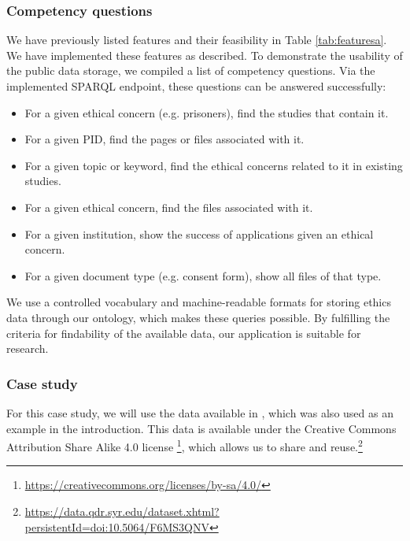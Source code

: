 \documentclass[10pt]{article}
\begin{document}
\subsubsection{Competency questions}
We have previously listed features and their feasibility in Table \ref{tab:featuresa}. We have implemented these features as described.
To demonstrate the usability of the public data storage, we compiled a list of competency questions. Via the implemented SPARQL endpoint, these questions can be answered successfully:

\begin{itemize}
    \item For a given ethical concern (e.g. prisoners), find the studies that contain it.
    \item For a given PID, find the pages or files associated with it.
    \item For a given topic or keyword, find the ethical concerns related to it in existing studies.
    \item For a given ethical concern, find the files associated with it.
    \item For a given institution, show the success of applications given an ethical concern.
    \item For a given document type (e.g. consent form), show all files of that type.
\end{itemize}

We use a controlled vocabulary and machine-readable formats for storing ethics data through our ontology, which makes these queries possible. By fulfilling the criteria for findability of the available data, our application is suitable for research.

\subsubsection{Case study}
For this case study, we will use the data available in \cite{casestudy}, which was also used as an example in the introduction. This data is available under the Creative Commons Attribution Share Alike 4.0 license \footnote{\url{https://creativecommons.org/licenses/by-sa/4.0/}}, which allows us to share and reuse.\footnote{\url{https://data.qdr.syr.edu/dataset.xhtml?persistentId=doi:10.5064/F6MS3QNV}}
\end{document}
